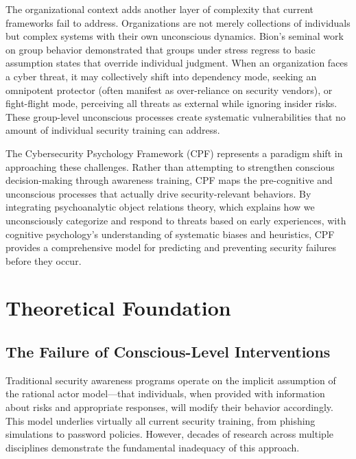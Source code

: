 \documentclass[11pt,a4paper]{article}
\begin{document}
The organizational context adds another layer of complexity that current frameworks fail to address. Organizations are not merely collections of individuals but complex systems with their own unconscious dynamics. Bion's seminal work on group behavior\cite{bion1961} demonstrated that groups under stress regress to basic assumption states that override individual judgment. When an organization faces a cyber threat, it may collectively shift into dependency mode, seeking an omnipotent protector (often manifest as over-reliance on security vendors), or fight-flight mode, perceiving all threats as external while ignoring insider risks. These group-level unconscious processes create systematic vulnerabilities that no amount of individual security training can address.

The Cybersecurity Psychology Framework (CPF) represents a paradigm shift in approaching these challenges. Rather than attempting to strengthen conscious decision-making through awareness training, CPF maps the pre-cognitive and unconscious processes that actually drive security-relevant behaviors. By integrating psychoanalytic object relations theory, which explains how we unconsciously categorize and respond to threats based on early experiences, with cognitive psychology's understanding of systematic biases and heuristics, CPF provides a comprehensive model for predicting and preventing security failures before they occur.

\section{Theoretical Foundation}

\subsection{The Failure of Conscious-Level Interventions}

Traditional security awareness programs operate on the implicit assumption of the rational actor model—that individuals, when provided with information about risks and appropriate responses, will modify their behavior accordingly\cite{ajzen1991}. This model underlies virtually all current security training, from phishing simulations to password policies. However, decades of research across multiple disciplines demonstrate the fundamental inadequacy of this approach.
\end{document}
